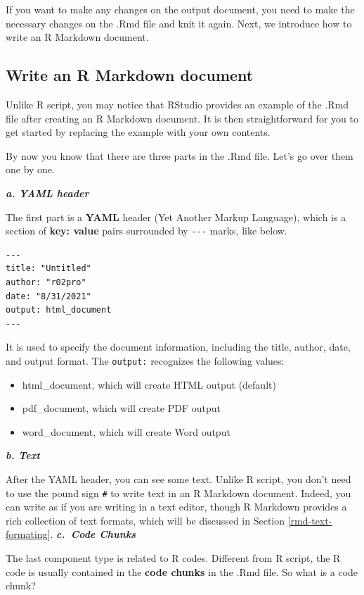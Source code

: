 \documentclass[
]{book}
\providecommand{\tightlist}{%
  \setlength{\itemsep}{0pt}\setlength{\parskip}{0pt}}
\begin{document}
If you want to make any changes on the output document, you need to make the necessary changes on the .Rmd file and knit it again. Next, we introduce how to write an R Markdown document.

\hypertarget{write-an-r-markdown-document}{%
\subsection{Write an R Markdown document}\label{write-an-r-markdown-document}}

Unlike R script, you may notice that RStudio provides an example of the .Rmd file after creating an R Markdown document. It is then straightforward for you to get started by replacing the example with your own contents.

By now you know that there are three parts in the .Rmd file. Let's go over them one by one.

\textbf{\emph{a. YAML header}}

The first part is a \textbf{YAML} header (Yet Another Markup Language), which is a section of \textbf{key: value} pairs surrounded by \texttt{-\/-\/-} marks, like below.

\begin{verbatim}
---
title: "Untitled"
author: "r02pro"
date: "8/31/2021"
output: html_document
---
\end{verbatim}

It is used to specify the document information, including the title, author, date, and output format. The \texttt{output:} recognizes the following values:

\begin{itemize}
\tightlist
\item
  html\_document, which will create HTML output (default)
\item
  pdf\_document, which will create PDF output
\item
  word\_document, which will create Word output
\end{itemize}

\textbf{\emph{b. Text}}

After the YAML header, you can see some text. Unlike R script, you don't need to use the pound sign \texttt{\#} to write text in an R Markdown document. Indeed, you can write as if you are writing in a text editor, though R Markdown provides a rich collection of text formats, which will be discussed in Section \ref{rmd-text-formating}.
\textbf{\emph{c.~Code Chunks}}

The last component type is related to R codes. Different from R script, the R code is usually contained in the \textbf{code chunks} in the .Rmd file. So what is a code chunk?
\end{document}
